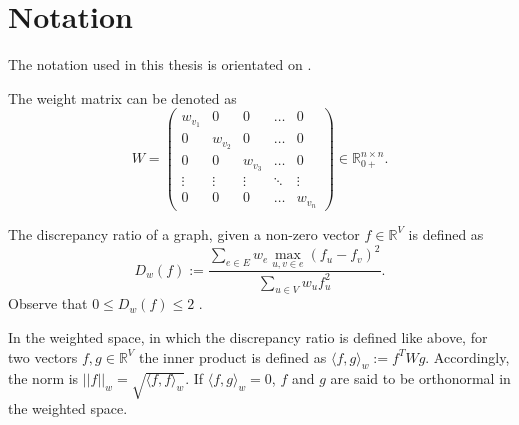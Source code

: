 \chapter{Notation}\label{chapter:notation}

The notation used in this thesis is orientated on \cite{ChanLTZ16}.



The weight matrix can be denoted as \begin{equation}
	W = 
	\begin{pmatrix}
	w_{v_1} & 0 & 0&\dots &0 \\
	0 & w_{v_2} & 0 & \ldots & 0 \\
	0 & 0 & w_{v_3} & \ldots & 0 \\
	\vdots & \vdots & \vdots & \ddots & \vdots \\
	0 &0&0& \ldots  & w_{v_n}
	\end{pmatrix} \in \mathbb{R}_{0+}^{n \times n} .
\end{equation} 

The discrepancy ratio of a graph, given a non-zero vector $f \in \mathbb{R}^V$ is defined as \begin{equation}
D_w(f) := \frac{\sum_{e\in E} w_e \max_{u,v\in e}(f_u - f_v)^2}{\sum_{u\in V} w_u f_u^2}.
\end{equation} Observe that $0\le D_w(f) \le 2 $ \cite{ChanLTZ16}.

In the weighted space, in which the discrepancy ratio is defined like above, for two vectors $f, g \in \mathbb{R}^V$ the inner product is defined as $ \langle f,g \rangle_w := f^T W g$. Accordingly, the norm is $||f||_w = \sqrt{ \langle f,f \rangle_w}$.
If $ \langle f,g \rangle_w   = 0 $, $f$ and $g$ are said to be orthonormal in the weighted space.


